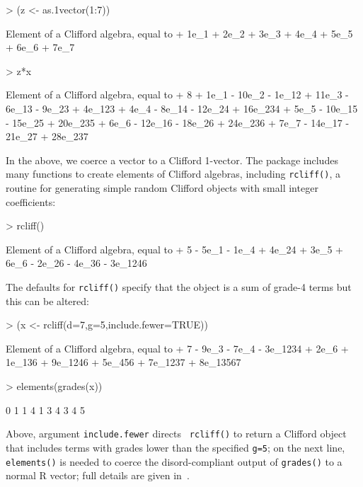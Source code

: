 \documentclass{birkjour}
\theoremstyle{definition}
\theoremstyle{remark}
\numberwithin{equation}{section}
\begin{document}
\begin{Schunk}
\begin{Sinput}
> (z <- as.1vector(1:7))
\end{Sinput}
\begin{Soutput}
Element of a Clifford algebra, equal to
+ 1e_1 + 2e_2 + 3e_3 + 4e_4 + 5e_5 + 6e_6 + 7e_7
\end{Soutput}
\begin{Sinput}
> z*x
\end{Sinput}
\begin{Soutput}
Element of a Clifford algebra, equal to
+ 8 + 1e_1 - 10e_2 - 1e_12 + 11e_3 - 6e_13 - 9e_23 + 4e_123 +
4e_4 - 8e_14 - 12e_24 + 16e_234 + 5e_5 - 10e_15 - 15e_25 + 20e_235 +
6e_6 - 12e_16 - 18e_26 + 24e_236 + 7e_7 - 14e_17 - 21e_27 + 28e_237
\end{Soutput}
\end{Schunk}
%
In the above, we coerce a vector to a Clifford 1-vector.  The package
includes many functions to create elements of Clifford algebras,
including {\tt rcliff()}, a routine for generating
simple random Clifford objects with small integer
  coefficients:

\begin{Schunk}
\begin{Sinput}
> rcliff()
\end{Sinput}
\begin{Soutput}
Element of a Clifford algebra, equal to
+ 5 - 5e_1 - 1e_4 + 4e_24 + 3e_5 + 6e_6 - 2e_26 - 4e_36 - 3e_1246
\end{Soutput}
\end{Schunk}
%
The defaults for {\tt rcliff()} specify that the object is a sum of
grade-4 terms but this can be altered:

\begin{Schunk}
\begin{Sinput}
> (x <- rcliff(d=7,g=5,include.fewer=TRUE))
\end{Sinput}
\begin{Soutput}
Element of a Clifford algebra, equal to
+ 7 - 9e_3 - 7e_4 - 3e_1234 + 2e_6 + 1e_136 + 9e_1246 + 5e_456
+ 7e_1237 + 8e_13567
\end{Soutput}
\begin{Sinput}
> elements(grades(x))
\end{Sinput}
\begin{Soutput}
 [1] 0 1 1 4 1 3 4 3 4 5
\end{Soutput}
\end{Schunk}
%
Above, argument {\tt include.fewer} directs {\tt
    rcliff()} to return a Clifford object that includes terms with
  grades lower than the specified {\tt g=5}; on the next line, {\tt
    elements()} is needed to coerce the disord-compliant output of
  {\tt grades()} to a normal R vector; full details are given
  in~\cite{hankin2022_disordR}.
\end{document}
